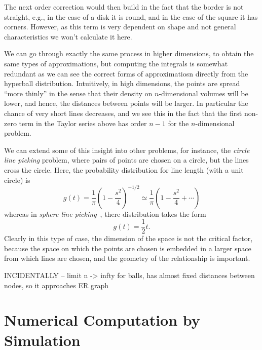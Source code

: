 \documentclass{article}
\begin{document}
The next order correction would then build in the fact that the border
is not straight, e.g., in the case of a disk it is round, and in the
case of the square it has corners. However, as this term is very
dependent on shape and not general characteristics we won't calculate
it here.

We can go through exactly the same process in higher dimensions, to
obtain the same types of approximations, but computing the integrals
is somewhat redundant as we can see the correct forms of
approximatiosn directly from the hyperball distribution. Intuitively,
in high dimensions, the points are spread ``more thinly'' in the sense
that their density on $n$-dimensional volumes will be lower, and
hence, the distances between points will be larger. In particular the
chance of very short lines decreases, and we see this in the fact that
the first non-zero term in the Taylor series above has order $n-1$ for
the $n$-dimensional problem.



We can extend some of this insight into other problems, for instance,
the {\em circle line picking} problem, where pairs of points are
chosen on a circle, but the lines cross the circle. Here, the
probability distribution for line length (with a unit circle) is
\cite{weisstein:_circle_line_picking}
\begin{equation}
  \label{eq:circle_line_picking}
  g(t) = \frac{1}{\pi} \left(    
           1 - \frac{s^2}{4}
               \right)^{-1/2} 
       \simeq \frac{1}{\pi} \left( 1 - \frac{s^2}{4} + \cdots \right) 
\end{equation}
whereas in {\em sphere line
  picking}~\cite{weisstein:_sphere_line_picking}, there distribution
takes the form
\begin{equation}
  \label{eq:sphere_line_picking_approx}
  g(t) = \frac{1}{2} t.
\end{equation}
Clearly in this type of case, the dimension of the space is not the
critical factor, because the space on which the points are chosen is
embedded in a larger space from which lines are chosen, and the
geometry of the relationship is important.


INCIDENTALLY -- limit n -> infty for balls, has almost fixed distances
between nodes, so it approaches ER graph




\section{Numerical Computation by Simulation}
\label{sec:numerical}
\end{document}
